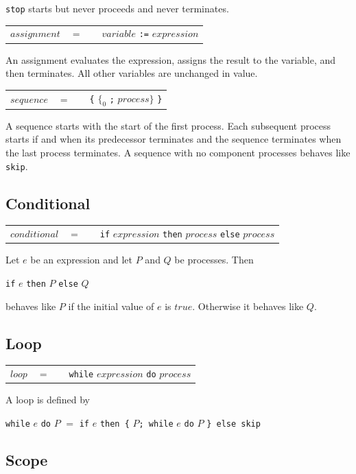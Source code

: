 \documentclass[a4paper, 12pt]{article}
\begin{document}
\verb|stop| starts but never proceeds and never terminates.

\begin{tabular}{llll}
$assignment$    & $=$ &&$variable$ \verb|:=| $expression$ 
\end{tabular}   

An assignment evaluates the expression, assigns the result to the variable,
and then terminates. All other variables are unchanged in value. 

\begin{tabular}{llll}
$sequence$    & $=$ &&\verb|{| $\{_0$ \verb|;| $process \}$ \verb|}| 
\end{tabular}   

A sequence starts with the start of the first process. Each subsequent process starts if and
when its predecessor terminates and the sequence terminates when the last process terminates.
A sequence with no component processes behaves like \verb|skip|.

\subsection*{Conditional}

\begin{tabular}{llll}
$conditional$    & $=$ &&\verb|if| $expression$ \verb|then| $process$ \verb|else| $process$
\end{tabular} 

Let $e$ be an expression and let $P$ and $Q$ be processes. Then

\verb|if| $e$ \verb|then| $P$ \verb|else| $Q$ 

behaves like $P$ if the initial value of $e$ is $true$. Otherwise it behaves like $Q$.

\subsection*{Loop}

\begin{tabular}{llll}
$loop$    & $=$ &&\verb|while| $expression$ \verb|do| $process$ 
\end{tabular} 

A loop is defined by 

\verb|while| $e$ \verb|do| $P$ $=$ \verb|if| $e$ \verb|then {| $P$\verb|; while| $e$ \verb|do| $P$ \verb|} else skip| 
        
\subsection*{Scope}
\end{document}
